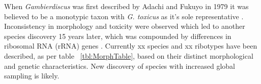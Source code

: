 \documentclass[12pt]{article}
\begin{document}
When \emph{Gambierdiscus} was first described by Adachi and Fukuyo in 1979 it was believed to be a monotypic taxon with \emph{G. toxicus} as it's sole representative \cite{adachi1979thecal}. Inconsistency in morphology and toxicity were observed which led to another species discovery 15 years later, which was compounded by differences in ribosomal RNA (rRNA) genes \cite{faust1995observation,holmes1990toxicity,holmes1991strain,chinain1997intraspecific,richlen2008phylogeography,bomber1988epiphytic,bomber1989epiphytism,bomber1989genitic,morton1993response}. Currently xx species and xx ribotypes have been described, as per table ~\ref{tbl:MorphTable}, based on their distinct morphological and genetic characteristics. New discovery of species with increased global sampling is likely. \\
\end{document}
